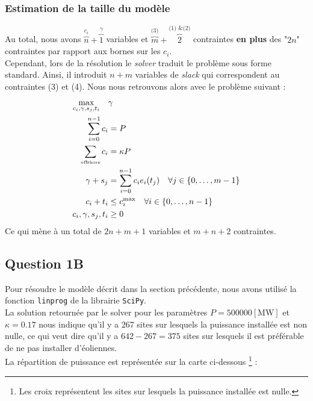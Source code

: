 \documentclass{article}
\begin{document}
\subsubsection*{Estimation de la taille du modèle}
\noindent
Au total, nous avons $\overbrace{n}^{c_i} + \overbrace{1}^{\gamma}$
variables et $\overbrace{m}^{\text{(3)}} + \overbrace{2}^{\text{(1) \& (2)}}$ contraintes \textbf{en plus} des "$2n$" contraintes par rapport aux bornes sur les $c_i$.\\
Cependant, lors de la résolution le \textit{solver} traduit le problème sous forme standard. Ainsi, il introduit $n + m$ variables de \textit{slack} qui correspondent au contraintes (3) et (4). Nous nous retrouvons alors avec le problème suivant : 
\begin{align*}
    \max_{c_i, \gamma, s_j, t_i} \quad  
    &\gamma \nonumber \\ 
    \sum_{i=0}^{n-1} c_i &= P\\
    \sum_{\text{\tiny offshore}}c_i &= \kappa P\\
    \gamma + s_j &= \sum_{i=0}^{n-1} c_i e_i(t_j) \quad \forall j \in \{0, \ldots, m-1\}\\
    c_i + t_i &\le c_i^{\max} \quad \forall i \in \{0, \ldots, n-1\}\\
    c_i, \gamma, s_j, t_i &\ge 0
\end{align*}
Ce qui mène à un total de $2n + m + 1$ variables et $m + n + 2$ contraintes.
\newpage
\subsection*{Question 1B}
Pour résoudre le modèle décrit dans la section précédente, nous avons utilisé la fonction \verb|linprog| de la librairie \verb|SciPy|.\\
La solution retournée par le solver pour les paramètres $P = 500000 [\mathrm{MW}]$ et $\kappa = 0.17$ nous indique qu'il y a $267$ sites sur lesquels la puissance installée est non nulle, ce qui veut dire qu'il y a $642 - 267 = 375$ sites sur lesquels il est préférable de ne pas installer d'éoliennes.\\
La répartition de puissance est représentée sur la carte ci-dessous \footnote{Les croix représentent les sites sur lesquels la puissance installée est nulle.} :
\end{document}
